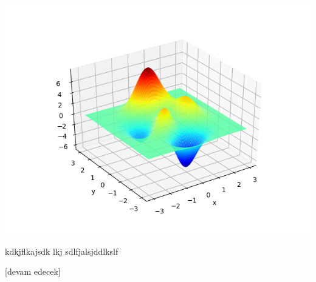 \documentclass[12pt,fleqn]{article}\usepackage{../../common}
\begin{document}
\includegraphics[width=35 em]{func_70_dfo_02.png}


kdkjflkajsdk lkj sdlfjalsjddlkslf


[devam edecek]
\end{document}
